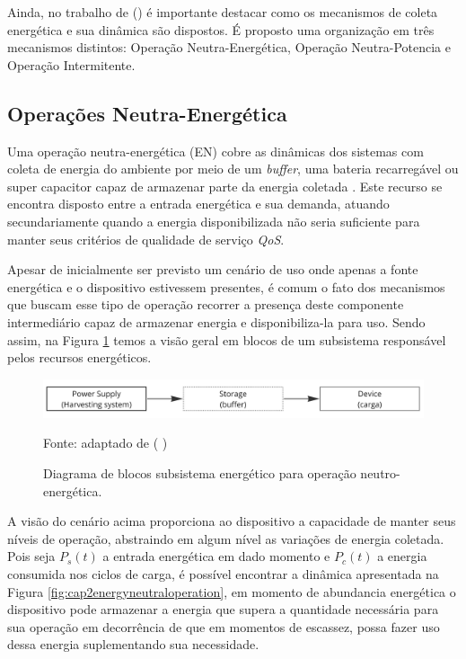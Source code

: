 Ainda, no trabalho de \citeauthor{sliper_energy-driven_2020} (\citeyear{sliper_energy-driven_2020}) é importante destacar como os mecanismos de coleta energética e sua dinâmica são dispostos. É proposto uma organização em três mecanismos distintos: Operação Neutra-Energética, Operação Neutra-Potencia e Operação Intermitente.

\subsection{Operações Neutra-Energética}
Uma operação neutra-energética (\acl{EN}) cobre as dinâmicas dos sistemas com coleta de energia do ambiente por meio de um \textit{buffer}, uma bateria recarregável ou super capacitor capaz de armazenar parte da energia coletada \cite{kansal_power_2007}. Este recurso se encontra disposto entre a entrada energética e sua demanda, atuando secundariamente quando a energia disponibilizada não seria suficiente para manter seus critérios de qualidade de serviço \textit{QoS}.

Apesar de inicialmente ser previsto um cenário de uso onde apenas a fonte energética e o dispositivo estivessem presentes, é comum o fato dos mecanismos que buscam esse tipo de operação recorrer a presença deste componente intermediário capaz de armazenar energia e disponibiliza-la para uso. Sendo assim, na Figura \ref{fig:cap2harveststoreuse} temos a visão geral em blocos de um subsistema responsável pelos recursos energéticos.

\begin{figure}[H]
	\centering
	\caption{Diagrama de blocos subsistema energético para operação neutro-energética.}
	\label{fig:cap2harveststoreuse}
	\includegraphics[width=0.7\linewidth]{Imagens/cap2/cap2harvest_store_use}	
	
	Fonte: adaptado de \citeauthor{sudevalayam_energy_2011} (\citeyear{sudevalayam_energy_2011} )
\end{figure}

A visão do cenário acima proporciona ao dispositivo a capacidade de manter seus níveis de operação, abstraindo em algum nível as variações de energia coletada. Pois seja $P_{s}(t)$ a entrada energética em dado momento e  $P_{c}(t)$ a energia consumida nos ciclos de carga, é possível encontrar a dinâmica apresentada na Figura \ref{fig:cap2energyneutraloperation}, em momento de abundancia energética o dispositivo pode armazenar a energia que supera a quantidade necessária para sua operação em decorrência de que em momentos de escassez, possa fazer uso dessa energia suplementando sua necessidade. 


